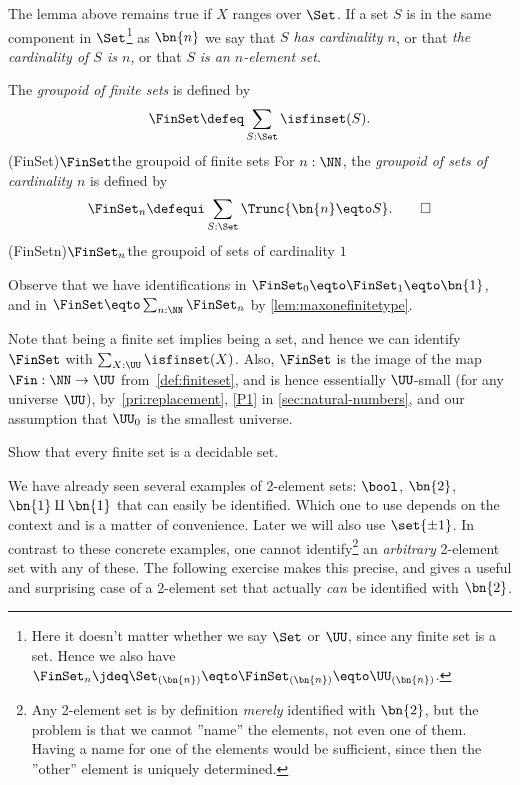 The lemma above remains true if $X$ ranges over $\Set$.
If a set $S$ is in the same component in $\Set$\footnote{%
  Here it doesn't matter whether we say $\Set$ or $\UU$,
  since any finite set is a set.
  Hence we also have $\FinSet_n
  \jdeq \Set_{(\bn{n})} \eqto \FinSet_{(\bn{n})}
 \eqto \UU_{(\bn{n})}$.}
as $\bn{n}$ we say that \emph{$S$ has cardinality $n$}, 
or that \emph{the cardinality of $S$ is $n$}, 
or that $S$ \emph{is an $n$-element set}.

\begin{definition}\label{def:groupoidFin}
The \emph{groupoid of finite sets} is defined by
\[
  \FinSet\defeq\sum_{S:\Set}\isfinset(S).
\]
\glossary(FinSet){$\protect\FinSet$}{the groupoid of finite sets}
For $n:\NN$, the \emph{groupoid of sets of cardinality $n$} is defined by
\[
  \FinSet_n\defequi \sum_{S:\Set}\Trunc{\bn{n}\eqto S}.\qedhere
\]
\glossary(FinSetn){$\protect\FinSet_n$}{the groupoid of sets of cardinality $1$}
\end{definition}
Observe that we have identifications in
$\FinSet_0 \eqto \FinSet_1 \eqto \bn{1} $, and in
$\FinSet \eqto \sum_{n:\NN}\FinSet_n$ by \cref{lem:maxonefinitetype}.

Note that being a finite set implies being a set, and hence
we can identify $\FinSet$ with $\sum_{X:\UU}\isfinset(X)$.
Also, $\FinSet$ is the image of the map $\Fin : \NN \to \UU$
from~\cref{def:finiteset}, and is hence essentially $\UU$-small
(for any universe $\UU$), by~\cref{pri:replacement}, \cref{P1} in
\cref{sec:natural-numbers}, and our assumption
that $\UU_0$ is the smallest universe.

\begin{xca}\label{xca:finsets-decidable}
Show that every finite set is a decidable set.
\end{xca}

We have already seen several examples of 2-element sets:
$\bool$, $\bn{2}$, $\bn{1}\amalg\bn{1}$ that can easily
be identified. Which one to use
depends on the context and is a matter of convenience.
Later we will also use $\set{\pm1}$. In contrast
to these concrete examples, one cannot identify\footnote{%
Any 2-element set is by definition \emph{merely} identified
with $\bn{2}$, but the problem is that we cannot ''name''
the elements, not even one of them. Having a name for one
of the elements would be sufficient, since then the ''other''
element is uniquely determined.}
an \emph{arbitrary} 2-element set with any of these.
The following exercise makes this precise, and gives a
useful and surprising case of a 2-element set
that actually \emph{can} be identified with $\bn{2}$.

